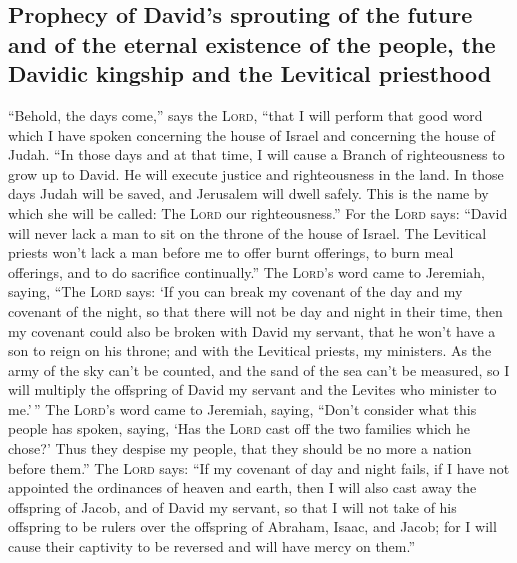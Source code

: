 \hypertarget{prophecy-of-davids-sprouting-of-the-future-and-of-the-eternal-existence-of-the-people-the-davidic-kingship-and-the-levitical-priesthood}{%
\subsection{Prophecy of David's sprouting of the future and of the
eternal existence of the people, the Davidic kingship and the Levitical
priesthood}\label{prophecy-of-davids-sprouting-of-the-future-and-of-the-eternal-existence-of-the-people-the-davidic-kingship-and-the-levitical-priesthood}}

 ``Behold, the days come,'' says the \textsc{Lord},
``that I will perform that good word which I have spoken concerning the
house of Israel and concerning the house of Judah.  ``In
those days and at that time, I will cause a Branch of righteousness to
grow up to David. He will execute justice and righteousness in the land.
 In those days Judah will be saved, and Jerusalem will
dwell safely. This is the name by which she will be called: The
\textsc{Lord} our righteousness.''  For the \textsc{Lord}
says: ``David will never lack a man to sit on the throne of the house of
Israel.  The Levitical priests won't lack a man before me
to offer burnt offerings, to burn meal offerings, and to do sacrifice
continually.''  The \textsc{Lord}'s word came to
Jeremiah, saying,  ``The \textsc{Lord} says: `If you can
break my covenant of the day and my covenant of the night, so that there
will not be day and night in their time,  then my
covenant could also be broken with David my servant, that he won't have
a son to reign on his throne; and with the Levitical priests, my
ministers.  As the army of the sky can't be counted, and
the sand of the sea can't be measured, so I will multiply the offspring
of David my servant and the Levites who minister to me.'\,''
 The \textsc{Lord}'s word came to Jeremiah, saying,
 ``Don't consider what this people has spoken, saying,
`Has the \textsc{Lord} cast off the two families which he chose?' Thus
they despise my people, that they should be no more a nation before
them.''  The \textsc{Lord} says: ``If my covenant of day
and night fails, if I have not appointed the ordinances of heaven and
earth,  then I will also cast away the offspring of
Jacob, and of David my servant, so that I will not take of his offspring
to be rulers over the offspring of Abraham, Isaac, and Jacob; for I will
cause their captivity to be reversed and will have mercy on them.''

